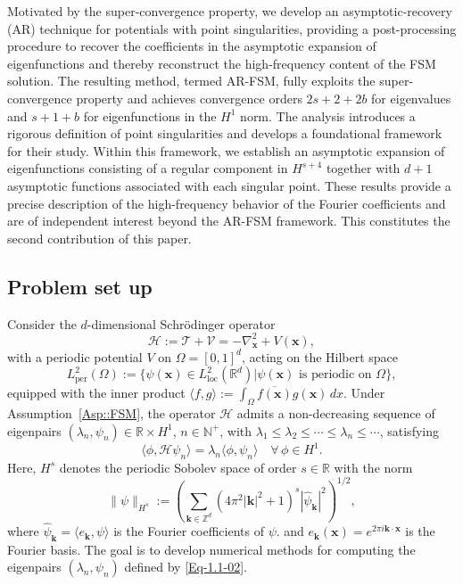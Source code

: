 \documentclass{sn-jnl}%
\numberwithin{equation}{section}
\theoremstyle{thmstyleone}%
\theoremstyle{thmstyletwo}%
\theoremstyle{thmstylethree}%
\begin{document}
Motivated by the super-convergence property, we develop an asymptotic-recovery (AR) technique for potentials with point singularities, providing a post-processing procedure to recover the coefficients in the asymptotic expansion of eigenfunctions and thereby reconstruct the high-frequency content of the FSM solution. The resulting method, termed AR-FSM, fully exploits the super-convergence property and achieves convergence orders $2s+2+2b$ for eigenvalues and $s+1+b$ for eigenfunctions in the $H^1$ norm.
The analysis introduces a rigorous definition of point singularities and develops a foundational framework for their study. Within this framework, we establish an asymptotic expansion of eigenfunctions consisting of a regular component in $H^{s+4}$ together with $d+1$ asymptotic functions associated with each singular point. These results provide a precise description of the high-frequency behavior of the Fourier coefficients and are of independent interest beyond the AR-FSM framework. This constitutes the second contribution of this paper.

\subsection{Problem set up}
Consider the $d$-dimensional Schr\"odinger operator
\begin{equation}
\label{Eq-1.1-01}
\mathcal{H} := \mathcal{T}+\mathcal{V} =-\nabla^2_{\bm{x}} + V(\bm{x}),
\end{equation}
with a periodic potential $V$ on $\Omega = [0, 1]^d$, acting on the Hilbert space
\[L_{\text{per}}^2(\Omega):=\{ \psi(\bm{x})\in L_{\text{loc}}^2(\mathbb{R}^d) | \text{$\psi(\bm{x})$ is periodic on $\Omega$}\},\]
equipped with the inner product $\langle f, g \rangle := \int_{\Omega} \overline{f(\bm x)}{g(\bm x)}  \, dx$.
Under Assumption~\ref{Asp::FSM}, the operator $\mathcal{H}$ admits a non-decreasing sequence of eigenpairs $(\lambda_n, \psi_n) \in \mathbb{R} \times H^1$, $n \in \mathbb{N}^+$, with $\lambda_1 \leq \lambda_2 \leq \cdots \leq \lambda_n \leq\cdots  $, satisfying
\begin{equation}
\label{Eq-1.1-02}
\langle \phi, \mathcal{H} \psi_n \rangle = \lambda_n \langle \phi, \psi_n \rangle \quad \forall\, \phi \in H^1.
\end{equation}
Here, $H^s$ denotes the periodic Sobolev space of order $s \in \mathbb{R}$ with the norm
\begin{equation}
\label{Eq-1.1-03}
\| \psi \|_{H^s} :=\left(\sum_{\bm{k} \in \mathbb{Z}^d} (4\pi^2|\bm{k}|^2 + 1)^{s} |\hat{\psi}_{\bm{k}}|^2\right)^{1/2},
\end{equation}
where $\hat{\psi}_{\bm k}  = \langle e_{\bm k},\psi\rangle$ is the Fourier coefficients of $\psi$.  and $e_{\bm k}(\bm x) = e^{2\pi i \bm k\cdot \bm x}$
is the Fourier basis. The goal is to develop numerical methods for computing the eigenpairs $(\lambda_n, \psi_n)$ defined by \eqref{Eq-1.1-02}.  
\end{document}
